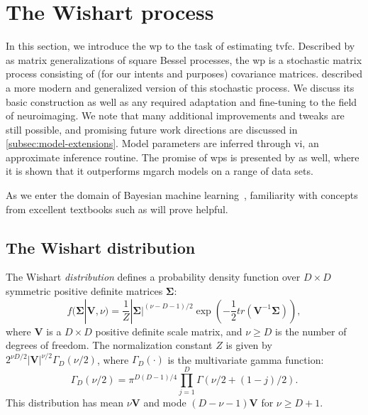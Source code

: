 \clearpage
\section{The Wishart process}\label{sec:wishart-process}

In this section, we introduce the \gls{wp} to the task of estimating \gls{tvfc}.
Described by \textcite{Bru1991} as matrix generalizations of square Bessel processes, the \gls{wp} is a stochastic matrix process consisting of (for our intents and purposes) covariance matrices.
\textcite{Wilson2010} described a more modern and generalized version of this stochastic process.
%
We discuss its basic construction as well as any required adaptation and fine-tuning to the field of neuroimaging.
We note that many additional improvements and tweaks are still possible, and promising future work directions are discussed in \cref{subsec:model-extensions}.
Model parameters are inferred through \gls{vi}, an approximate inference routine.
The promise of \glspl{wp} is presented by \textcite{Wilson2010, Heaukulani2019} as well, where it is shown that it outperforms \gls{mgarch} models on a range of data sets.

As we enter the domain of Bayesian machine learning~\parencite{Ghahramani2015}, familiarity with concepts from excellent textbooks such as \textcite{MacKay2002, Bishop2006, Hastie2009, Murphy2012, Murphy2023} will prove helpful.

\subsection{The Wishart distribution}\label{subsec:wishart-distribution}

The Wishart \emph{distribution} defines a probability density function over $D \times D$ symmetric positive definite matrices $\mathbf{\Sigma}$:
\begin{equation}
  f(\mathbf{\Sigma}|\mathbf{V},\nu) = \frac{1}{Z} |\mathbf{\Sigma}|^{(\nu - D - 1)/2} \exp{(-\frac12tr(\mathbf{V}^{-1}\mathbf{\Sigma}))},
\end{equation}
where $\mathbf{V}$ is a $D \times D$ positive definite scale matrix, and $\nu \geq D$ is the number of degrees of freedom.
The normalization constant $Z$ is given by $2^{\nu D/2}|\mathbf{V}|^{\nu/2}\Gamma_D(\nu/2)$, where $\Gamma_D(\cdot)$ is the multivariate gamma function:
\begin{equation}
  \Gamma_D(\nu/2) = \pi^{D(D-1)/4} \prod_{j=1}^D \Gamma(\nu/2 + (1-j)/2).
\end{equation}
This distribution has mean $\nu \mathbf{V}$ and mode $(D - \nu - 1)\mathbf{V}$ for $\nu \geq D + 1$.

